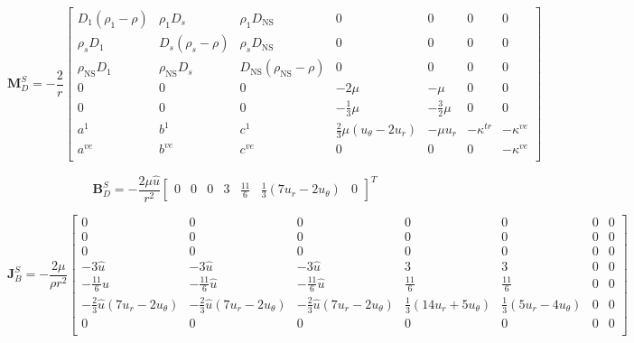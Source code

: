 \documentclass[10pt]{article}
\begin{document}
\begin{flushleft}
\begin{equation*}
    \boldsymbol{M}_D^S = -\frac{2}{r}\begin{bmatrix}
        D_1(\rho_1-\rho) & \rho_1 D_s & \rho_1 D_\text{NS} & 0 & 0 & 0 & 0 \\
        \rho_s D_1 & D_s(\rho_s - \rho) & \rho_s D_\text{NS} & 0 & 0 & 0 & 0 \\
        \rho_\text{NS} D_1 & \rho_\text{NS} D_s & D_\text{NS}(\rho_\text{NS} - \rho) & 0 & 0 & 0 & 0 \\
        0 & 0 & 0 & -2 \mu & -\mu & 0 & 0 \\
        0 & 0 & 0 & -\frac{1}{3} \mu & -\frac{3}{2} \mu & 0 & 0 \\
        a^1 & b^1 & c^1 & \frac{2}{3} \mu (u_\theta - 2 u_r) & -\mu u_r & -\kappa^{tr} & -\kappa^{ve} \\
        a^{ve} & b^{ve} & c^{ve} & 0 & 0 & 0 & -\kappa^{ve} \\
    \end{bmatrix}
\end{equation*}

\begin{equation*}
    \boldsymbol{B}_D^S = -\frac{2 \mu \hat{u}}{r^2} \begin{bmatrix}
        0 & 0 & 0 & 3 & \frac{11}{6} & \frac{1}{3}(7 u_r - 2 u _\theta) & 0
    \end{bmatrix}^T
\end{equation*}

\begin{equation*}
    \boldsymbol{J}_B^S = - \frac{2 \mu}{ \rho r^2} \begin{bmatrix}
        0 & 0 & 0 & 0 & 0 & 0 & 0 \\
        0 & 0 & 0 & 0 & 0 & 0 & 0 \\
        0 & 0 & 0 & 0 & 0 & 0 & 0 \\
        -3\hat{u} & -3\hat{u} & -3\hat{u} & 3 & 3 & 0 & 0 \\
        -\frac{11}{6} \hat{u} & -\frac{11}{6} \hat{u} & -\frac{11}{6} \hat{u} & \frac{11}{6} & \frac{11}{6} & 0 & 0 \\
        -\frac{2}{3} \hat{u} (7 u_r - 2 u_\theta) & -\frac{2}{3} \hat{u} (7 u_r - 2 u_\theta) & -\frac{2}{3} \hat{u} (7 u_r - 2 u_\theta) & \frac{1}{3} (14 u_r + 5 u_\theta) & \frac{1}{3} (5 u_r - 4 u_\theta) & 0 & 0 \\
        0 & 0 & 0 & 0 & 0 & 0 & 0 \\
    \end{bmatrix}
\end{equation*}


\end{flushleft}
\end{document}
